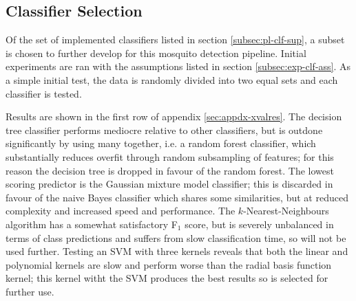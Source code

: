       
     
    \subsection{Classifier Selection}
    \label{subsec:exp-clf-select}
        Of the set of implemented classifiers listed in section \ref{subsec:pl-clf-sup}, a subset is chosen to further develop for this mosquito detection pipeline. Initial experiments are ran with the assumptions listed in section \ref{subsec:exp-clf-ass}. As a simple initial test, the data is randomly divided into two equal sets and each classifier is tested.
        
        Results are shown in the first row of appendix \ref{sec:appdx-xvalres}. The decision tree classifier performs mediocre relative to other classifiers, but is outdone significantly by using many together, i.e. a random forest classifier, which substantially reduces overfit through random subsampling of features; for this reason the decision tree is dropped in favour of the random forest. The lowest scoring predictor is the Gaussian mixture model classifier; this is discarded in favour of the naive Bayes classifier which shares some similarities, but at reduced complexity and increased speed and performance. The $k$-Nearest-Neighbours algorithm has a somewhat satisfactory F$_1$ score, but is severely unbalanced in terms of class predictions and suffers from slow classification time, so will not be used further. Testing an SVM with three kernels reveals that both the linear and polynomial kernels are slow and perform worse than the radial basis function kernel; this kernel witht the SVM produces the best results so is selected for further use.
        
       
